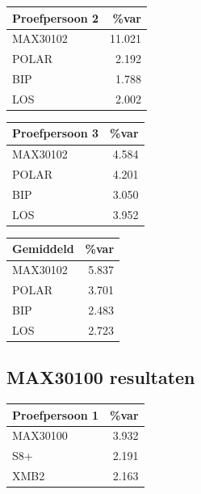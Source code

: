 \documentclass[11pt]{article}
\begin{document}
	\begin{table}[H]
	\begin{tabular}{l|r}
		\textbf{Proefpersoon 2}  & \%var  \\
	\hline
	MAX30102	& 11.021 \\
	POLAR		& 2.192  \\
	BIP		& 1.788  \\
	LOS		& 2.002  \\
	\end{tabular}
	\end{table}

	\begin{table}[H]
	\begin{tabular}{l|r}
		\textbf{Proefpersoon 3}  & \%var  \\
	\hline
	MAX30102	& 4.584  \\
	POLAR		& 4.201  \\
	BIP		& 3.050  \\
	LOS		& 3.952  \\
	\end{tabular}
	\end{table}


	\begin{table}[H]
	\begin{tabular}{l|r}
		\textbf{Gemiddeld   }\hspace{0.7cm}  & \%var  \\
		\hline
	MAX30102	& 5.837  \\
	POLAR		& 3.701  \\
	BIP		& 2.483  \\
	LOS		& 2.723  \\
	\end{tabular}
	\end{table}
	

\subsection{MAX30100 resultaten}\label{subsec:max30100 resultaten}

	\begin{table}[H]
	\begin{tabular}{l|r}
\textbf{Proefpersoon 1}  & \%var  \\
	\hline
	MAX30100	& 3.932  \\
	S8+		& 2.191  \\
	XMB2		& 2.163  \\
	\end{tabular}
	\end{table}
\end{document}
